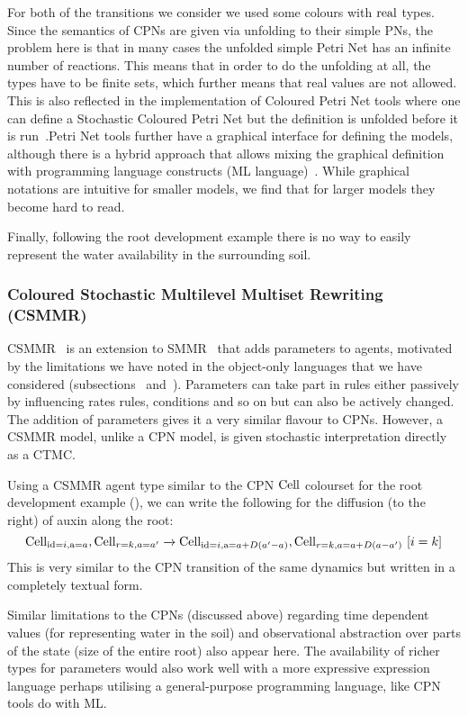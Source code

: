 For both of the transitions we consider we used some colours with $\mathrm{real}$
types. Since the semantics of CPNs are given via unfolding to their simple PNs,
the problem here is that in many cases the unfolded simple Petri Net has an
infinite number of reactions. This means that in order to do the unfolding at
all, the types have to be finite sets, which further means that real values are
not allowed. This is also reflected in the implementation of Coloured Petri Net
tools where one can define a Stochastic Coloured Petri Net but the definition is
unfolded before it is run~\citep{heiner_snoopyunifying_2012}.Petri Net tools
further have a graphical interface for defining the models, although there is a
hybrid approach that allows mixing the graphical definition with programming
language constructs (ML language)~\cite{jensen_coloured_1987}. While graphical
notations are intuitive for smaller models, we find that for larger models
they become hard to read.

Finally, following the root development example there is no way to easily
represent the water availability in the surrounding soil.

\subsubsection*{Coloured Stochastic Multilevel Multiset Rewriting (CSMMR)}
CSMMR~\citep{oury_coloured_2011} is an extension to
SMMR~\citep{oury_multi-level_2013} that adds parameters to agents, motivated by
the limitations we have noted in the object-only languages that we have
considered (subsections~ and~). Parameters can take
part in rules either passively by influencing rates rules, conditions and so on
but can also be actively changed. The addition of parameters gives it a very
similar flavour to CPNs. However, a CSMMR model, unlike a CPN model, is given
stochastic interpretation directly as a CTMC.

Using a CSMMR agent type similar to the CPN $\mathrm{Cell}$ colourset for the root
development example (), we can write the following
for the diffusion (to the right) of auxin along the root:
$$
\mathrm{Cell}_{\mathrm{id}=i, \mathrm{a}=a}, \mathrm{Cell}_{r=k, a=a'} \xrightarrow{}
\mathrm{Cell}_{\mathrm{id}=i, \mathrm{a}=a+D(a'-a)}, \mathrm{Cell}_{r=k, a=a+D(a-a')} \, \,
[i=k]
$$
This is very similar to the CPN transition of the same dynamics but written in a
completely textual form.

Similar limitations to the CPNs (discussed above) regarding time dependent
values (\eg for representing water in the soil) and observational abstraction
over parts of the state (\eg size of the entire root) also appear here. The
availability of richer types for parameters would also work well with a more
expressive expression language perhaps utilising a general-purpose programming
language, like CPN tools do with ML.

